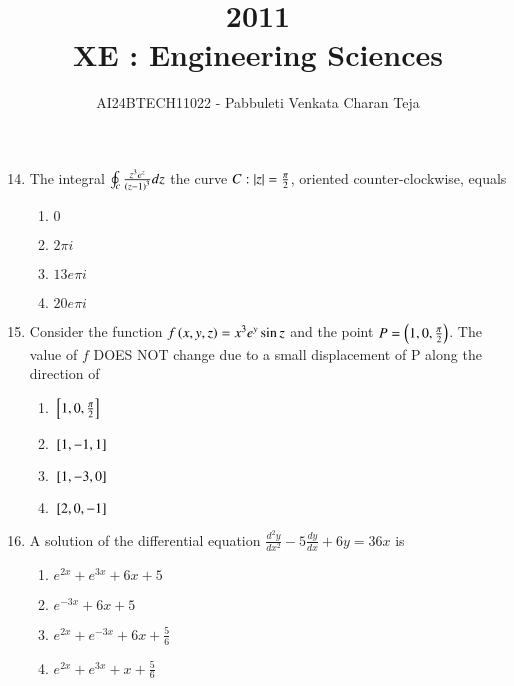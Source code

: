 \documentclass[journal]{IEEEtran}
\begin{document}

\vspace{3cm}

\title{2011\\XE : Engineering Sciences}
\author{AI24BTECH11022 - Pabbuleti Venkata Charan Teja}
\maketitle

\renewcommand{\thefigure}{\theenumi}
\renewcommand{\thetable}{\theenumi}


\begin{enumerate}
\setcounter{enumi}{13}
\item The integral $\oint_{c}\frac{z^{3}e^{z}}{\left(z - 1\right)^{3}}dz$ the curve $C:\left\vert z\right\vert=\frac{\pi}{2}$, oriented counter-clockwise, equals
\begin{multicols}{2}
\begin{enumerate}
\item $0$
\item $2\pi i$
\item $13e\pi i$
\item $20e\pi i$
\end{enumerate}
\end{multicols}


\item Consider the function $f\left(x,y,z\right)=x^{3}e^{y}\sin{z}$ and the point $P=\left(1,0,\frac{\pi}{2}\right)$. The value of $f$ DOES NOT change due to a small displacement of P along the direction of
\begin{multicols}{2}
\begin{enumerate}
\item ${}\left[1,0,\frac{\pi}{2}\right]$
\item ${}\left[1,-1,1\right]$
\item ${}\left[1,-3,0\right]$
\item ${}\left[2,0,-1\right]$
\end{enumerate}
\end{multicols}


\item A solution of the differential equation $\frac{d^{2}y}{dx^{2}}-5\frac{dy}{dx}+6y=36x$ is
\begin{multicols}{2}
\begin{enumerate}
\item $e^{2x}+e^{3x}+6x+5$
\item $e^{-3x}+6x+5$
\item $e^{2x}+e^{-3x}+6x+\frac{5}{6}$
\item $e^{2x}+e^{3x}+x+\frac{5}{6}$
\end{enumerate}
\end{multicols}


\end{enumerate}
\end{document}
